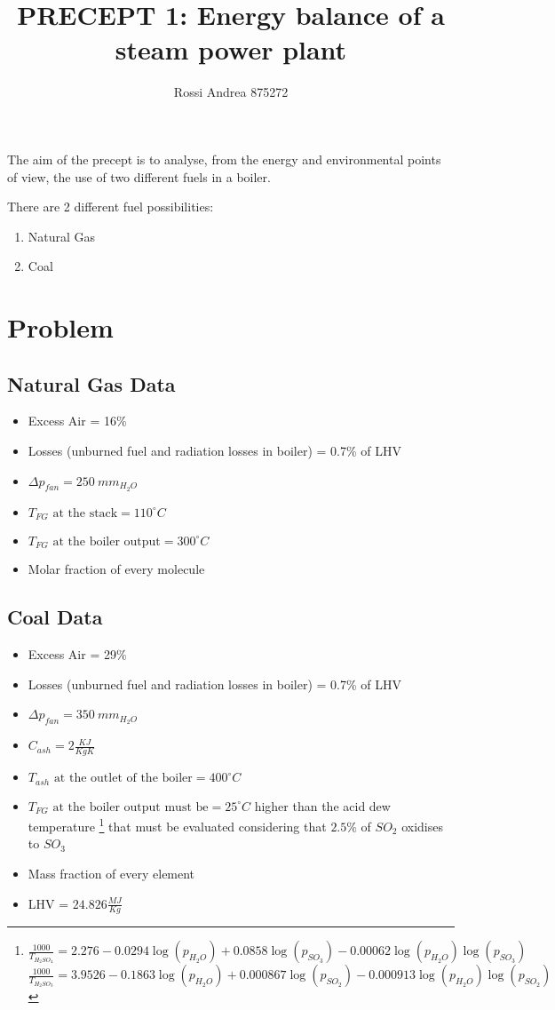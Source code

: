 \documentclass[a4paper,12pt]{article}
\title{\textbf{PRECEPT 1}: Energy balance of a steam power plant}
\author{Rossi Andrea 875272}
\date{}
\begin{document}
\maketitle
The	aim	of	the	precept	is	to	analyse, from the	energy	and	environmental points	of	view, the	use	of	two	different fuels in a boiler.
	
There are 2 different fuel possibilities:
\begin{enumerate}
\item Natural Gas
\item Coal
\end{enumerate}

\section{Problem}
\subsection*{Natural Gas Data}
\begin{itemize}
\item Excess Air = 16\%
\item Losses (unburned fuel and radiation losses in boiler) = 0.7\% of LHV
\item $ \Delta p_{fan}=250\ mm_{H_{2}O} $
\item $ T_{FG} \mbox{\ at the stack} = 110 ^\circ C $
\item $ T_{FG} \mbox{\ at the boiler output} = 300 ^\circ C $
 \item Molar fraction  of every molecule
\end{itemize}

\subsection*{Coal Data}
\begin{itemize}
\item Excess Air = 29\%
\item Losses (unburned fuel and radiation losses in boiler) = 0.7\% of LHV
\item $ \Delta p_{fan}=350\ mm_{H_2O} $
\item $ C_{ash} = 2 \frac{KJ}{KgK} $
\item $ T_{ash} \mbox{\ at the outlet of the boiler} = 400 ^\circ C $
\item $ T_{FG} \mbox{\ at the boiler output must be} = 25 ^\circ C $ higher than the acid dew temperature
\footnote{$\frac{1000}{T_{H_2SO_4}}=2.276-0.0294\log(p_{H_2O})+0.0858\log(p_{SO_3})-0.00062\log(p_{H_2O})\log(p_{SO_3})$\\
$\frac{1000}{T_{H_2SO_3}}=3.9526-0.1863\log(p_{H_2O})+0.000867\log(p_{SO_2})-0.000913\log(p_{H_2O})\log(p_{SO_2})$
}
 that must be evaluated considering that $2.5\%$ of $SO_2$ oxidises to $SO_3$
 \item Mass fraction of every element
 \item LHV = $24.826\frac{MJ}{Kg}$
\end{itemize}
\end{document}
